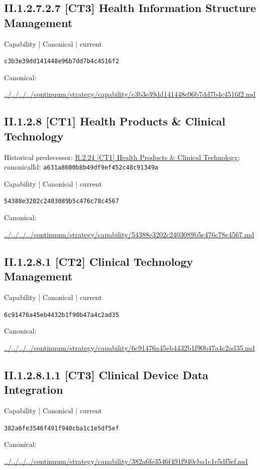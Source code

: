 \documentclass[10pt,a4paper]{article}
\begin{document}
\subsection*{II.1.2.7.2.7 [CT3] Health Information Structure Management}
\label{element-c3b3e39dd141448e96b7dd7b4c4516f2}
{\small Capability | Canonical | current}\par
\texttt{c3b3e39dd141448e96b7dd7b4c4516f2}\par
Canonical: \par
{\footnotesize\url{../../../../continuum/strategy/capability/c3b3e39dd141448e96b7dd7b4c4516f2.md}}\par
\subsection*{II.1.2.8 [CT1] Health Products \& Clinical Technology}
Historical predecessor: \hyperref[element-a631a8600b8b49df9ef452c48c91349a]{R.2.24 [CT1] Health Products \& Clinical Technology}; canonicalId: \texttt{a631a8600b8b49df9ef452c48c91349a}\par
\label{element-54388e3202c2403089b5c476c78c4567}
{\small Capability | Canonical | current}\par
\texttt{54388e3202c2403089b5c476c78c4567}\par
Canonical: \par
{\footnotesize\url{../../../../continuum/strategy/capability/54388e3202c2403089b5c476c78c4567.md}}\par
\subsection*{II.1.2.8.1 [CT2] Clinical Technology Management}
\label{element-6c91476a45eb4432b1f90b47a4c2ad35}
{\small Capability | Canonical | current}\par
\texttt{6c91476a45eb4432b1f90b47a4c2ad35}\par
Canonical: \par
{\footnotesize\url{../../../../continuum/strategy/capability/6c91476a45eb4432b1f90b47a4c2ad35.md}}\par
\subsection*{II.1.2.8.1.1 [CT3] Clinical Device Data Integration}
\label{element-382a6fe3546f491f940cba1c1e5df5ef}
{\small Capability | Canonical | current}\par
\texttt{382a6fe3546f491f940cba1c1e5df5ef}\par
Canonical: \par
{\footnotesize\url{../../../../continuum/strategy/capability/382a6fe3546f491f940cba1c1e5df5ef.md}}\par
\end{document}
